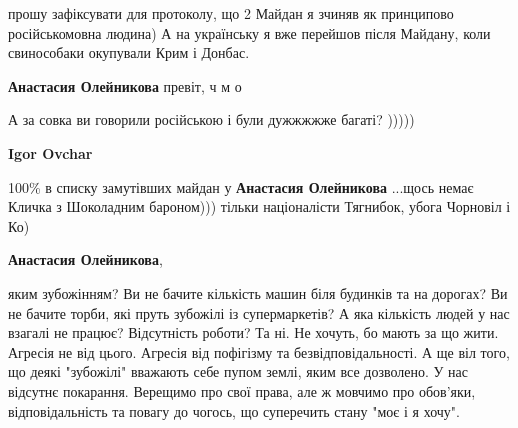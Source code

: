 \begin{itemize}
\begin{itemize}
прошу зафіксувати для протоколу, що 2 Майдан я зчиняв як принципово
російськомовна людина) А на українську я вже перейшов після Майдану, коли
свинособаки окупували Крим і Донбас.


 
\textbf{Анастасия Олейникова} превіт, ч м о

 
А за совка ви говорили російською і були дужжжжже багаті? )))))

 
\textbf{Igor Ovchar} 

100\% в списку замутівших майдан у \textbf{Анастасия Олейникова} ...щось немає Кличка з
Шоколадним бароном))) тільки націоналісти Тягнибок, убога Чорновіл і Ко)

 
\textbf{Анастасия Олейникова}, 

яким зубожінням? Ви не бачите кількість машин біля будинків та на дорогах? Ви
не бачите торби, які пруть зубожілі із супермаркетів? А яка кількість людей у
нас взагалі не працює? Відсутність роботи? Та ні. Не хочуть, бо мають за що
жити. Агресія не від цього. Агресія від пофігізму та безвідповідальності. А ще
віл того, що деякі "зубожілі" вважають себе пупом землі, яким все дозволено. У
нас відсутнє покарання. Верещимо про свої права, але ж мовчимо про обов'яки,
відповідальність та повагу до чогось, що суперечить стану "моє і я хочу".


 

\end{itemize}
\end{itemize}
